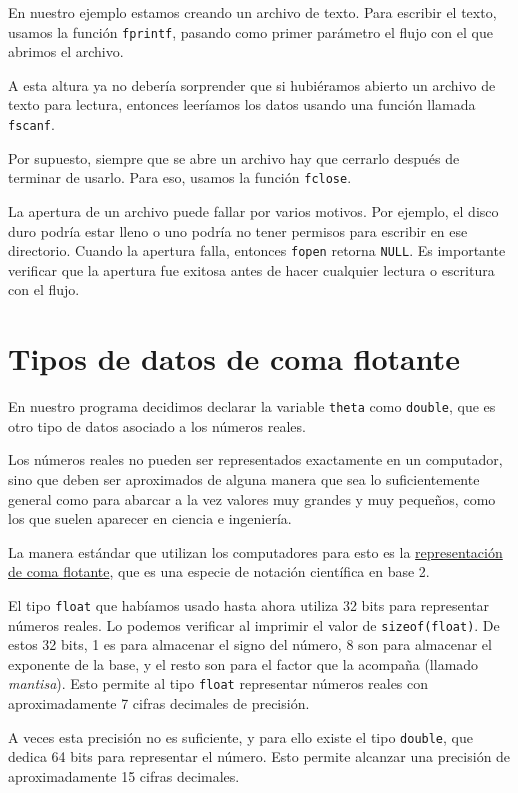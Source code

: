 En nuestro ejemplo estamos creando un archivo de texto. Para escribir el
texto, usamos la función \lstinline!fprintf!, pasando como primer
parámetro el flujo con el que abrimos el archivo.

A esta altura ya no debería sorprender que si hubiéramos abierto un
archivo de texto para lectura, entonces leeríamos los datos usando una
función llamada \lstinline!fscanf!.

Por supuesto, siempre que se abre un archivo hay que cerrarlo después de
terminar de usarlo. Para eso, usamos la función \lstinline!fclose!.

La apertura de un archivo puede fallar por varios motivos. Por ejemplo,
el disco duro podría estar lleno o uno podría no tener permisos para
escribir en ese directorio. Cuando la apertura falla, entonces
\lstinline!fopen! retorna \lstinline!NULL!. Es importante verificar que
la apertura fue exitosa antes de hacer cualquier lectura o escritura con
el flujo.

\section{Tipos de datos de coma flotante}

En nuestro programa decidimos declarar la variable \lstinline!theta!
como \lstinline!double!, que es otro tipo de datos asociado a los
números reales.

Los números reales no pueden ser representados exactamente en un
computador, sino que deben ser aproximados de alguna manera que sea lo
suficientemente general como para abarcar a la vez valores muy grandes y
muy pequeños, como los que suelen aparecer en ciencia e ingeniería.

La manera estándar que utilizan los computadores para esto es la
\href{http://es.wikipedia.org/wiki/Coma\_flotante}{representación de
coma flotante}, que es una especie de notación científica en base 2.

El tipo \lstinline!float! que habíamos usado hasta ahora utiliza 32 bits
para representar números reales. Lo podemos verificar al imprimir el
valor de \lstinline!sizeof(float)!. De estos 32 bits, 1 es para
almacenar el signo del número, 8 son para almacenar el exponente de la
base, y el resto son para el factor que la acompaña (llamado
\emph{mantisa}). Esto permite al tipo \lstinline!float! representar
números reales con aproximadamente 7 cifras decimales de precisión.

A veces esta precisión no es suficiente, y para ello existe el tipo
\lstinline!double!, que dedica 64 bits para representar el número. Esto
permite alcanzar una precisión de aproximadamente 15 cifras decimales.

